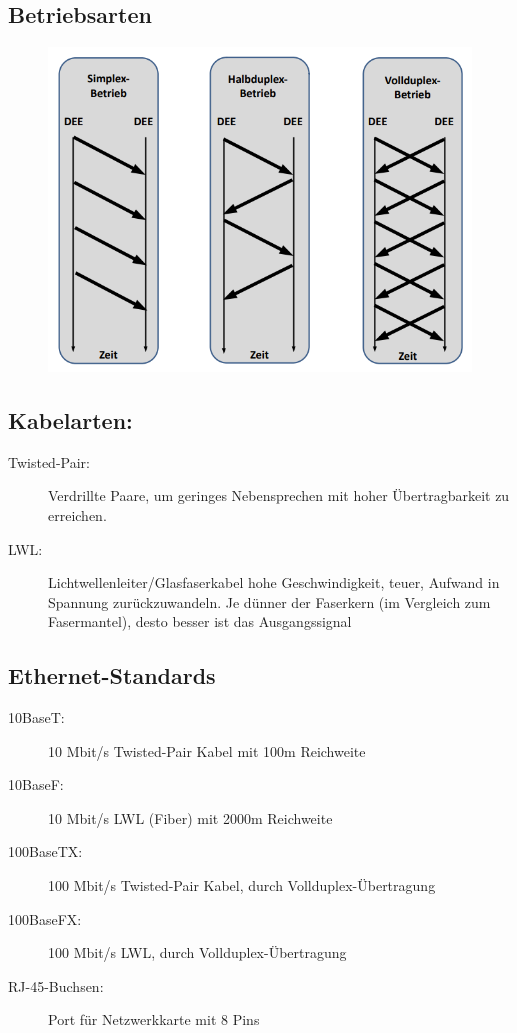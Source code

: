 \documentclass[12pt,a4paper]{article}
\begin{document}
		\subsection{Betriebsarten}
			\begin{center}
				\begin{figure}[!h]
					\includegraphics[scale=1]{Bilder/Duplexarten.PNG}
				\end{figure}
			\end{center}

		\subsection{Kabelarten:}
		\begin{description}
			\item[Twisted-Pair: ] Verdrillte Paare, um geringes Nebensprechen mit hoher Übertragbarkeit zu erreichen.
			\item[LWL: ] Lichtwellenleiter/Glasfaserkabel hohe Geschwindigkeit, teuer, Aufwand in Spannung zurückzuwandeln. Je dünner der Faserkern (im Vergleich zum Fasermantel), desto besser ist das Ausgangssignal
		\end{description}

		\subsection{Ethernet-Standards}
		\begin{description}
			\item[10BaseT: ] 10 Mbit/s Twisted-Pair Kabel mit 100m Reichweite
			\item[10BaseF: ] 10 Mbit/s LWL (Fiber) mit 2000m Reichweite 
			\item[100BaseTX: ] 100 Mbit/s Twisted-Pair Kabel, durch Vollduplex-Übertragung
			\item[100BaseFX: ]  100 Mbit/s LWL, durch Vollduplex-Übertragung
			\item[RJ-45-Buchsen: ] Port für Netzwerkkarte mit 8 Pins
		\end{description}
\end{document}
